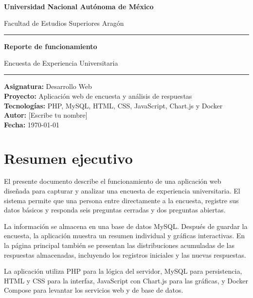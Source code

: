 \documentclass[12pt,letterpaper,oneside]{extreport}
\begin{document}
\begin{titlepage}
\centering
\vspace*{1.2cm}
{\Huge\bfseries Universidad Nacional Autónoma de México\par}
\vspace{0.5cm}
{\LARGE Facultad de Estudios Superiores Aragón\par}
\vspace{2cm}
\rule{\linewidth}{1.5pt}
\vspace{0.7cm}
{\Huge\bfseries Reporte de funcionamiento\par}
\vspace{0.4cm}
{\LARGE Encuesta de Experiencia Universitaria\par}
\vspace{0.7cm}
\rule{\linewidth}{1.5pt}
\vfill
\begin{flushleft}
\large
\textbf{Asignatura:} Desarrollo Web\\[0.35cm]
\textbf{Proyecto:} Aplicación web de encuesta y análisis de respuestas\\[0.35cm]
\textbf{Tecnologías:} PHP, MySQL, HTML, CSS, JavaScript, Chart.js y Docker\\[0.35cm]
\textbf{Autor:} [Escribe tu nombre]\\[0.35cm]
\textbf{Fecha:} \today
\end{flushleft}
\end{titlepage}

\tableofcontents
\newpage

\chapter{Resumen ejecutivo}

El presente documento describe el funcionamiento de una aplicación web diseñada para capturar y analizar una encuesta de experiencia universitaria. El sistema permite que una persona entre directamente a la encuesta, registre sus datos básicos y responda seis preguntas cerradas y dos preguntas abiertas.

La información se almacena en una base de datos MySQL. Después de guardar la encuesta, la aplicación muestra un resumen individual y gráficas interactivas. En la página principal también se presentan las distribuciones acumuladas de las respuestas almacenadas, incluyendo los registros iniciales y las nuevas respuestas.

La aplicación utiliza PHP para la lógica del servidor, MySQL para persistencia, HTML y CSS para la interfaz, JavaScript con Chart.js para las gráficas, y Docker Compose para levantar los servicios web y de base de datos.
\end{document}
